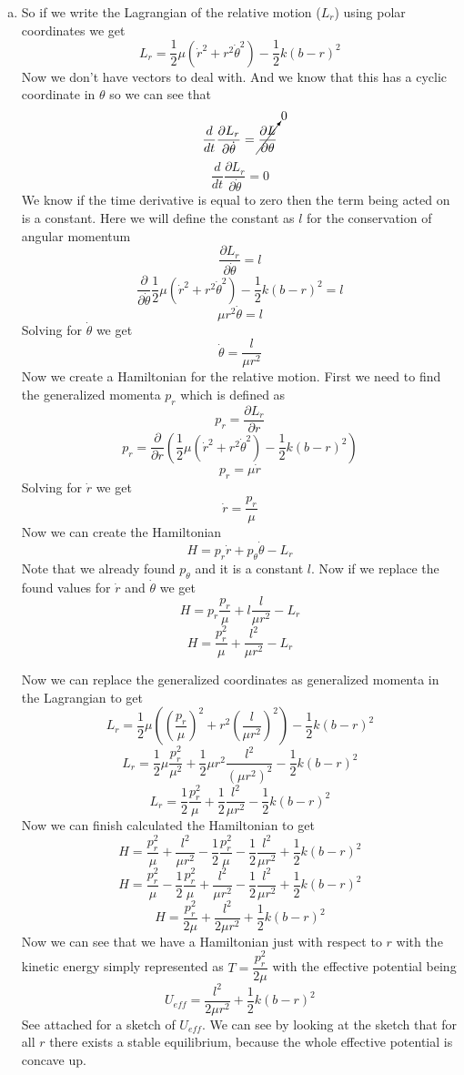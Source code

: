 \documentclass[11pt]{article}
\numberwithin{equation}{section}
\begin{document}
\begin{enumerate}[(a)]
\item
So if we write the Lagrangian of the relative motion ($L_r$) using polar coordinates we get
$$L_r = \frac{1}{2}\mu\left(\dot{r}^2 + r^2\dot{\theta}^2\right) - \frac{1}{2}k\left(b-r\right)^2$$
Now we don't have vectors to deal with. And we know that this has a cyclic coordinate in $\theta$ so we can see that
$$\frac{d}{dt}\frac{\partial L_r}{\partial \dot{\theta}} = \cancelto{0}{\frac{\partial L}{\partial {\theta}}}$$
$$\frac{d}{dt}\frac{\partial L_r}{\partial \dot{\theta}} = 0$$
We know if the time derivative is equal to zero then the term being acted on is a constant. Here we will define the constant as $l$ for the conservation of angular momentum 
$$\frac{\partial L_r}{\partial \dot{\theta}} = l$$
$$\frac{\partial}{\partial \dot{\theta}}\frac{1}{2}\mu\left(\dot{r}^2 + r^2\dot{\theta}^2\right) - \frac{1}{2}k\left(b-r\right)^2 = l$$
$$\mu r^2\dot{\theta} = l$$
Solving for $\dot{\theta}$ we get
$$\dot{\theta} = \frac{l}{\mu r^2}$$
Now we create a Hamiltonian for the relative motion. First we need to find the generalized momenta $p_r$ which is defined as
$$p_r = \frac{\partial L_r}{\partial r}$$
$$p_r = \frac{\partial}{\partial r}\left(\frac{1}{2}\mu\left(\dot{r}^2 + r^2\dot{\theta}^2\right) - \frac{1}{2}k\left(b-r\right)^2\right)$$
$$p_r = \mu \dot{r}$$
Solving for $\dot{r}$ we get
$$ \dot{r}= \frac{p_r}{\mu} $$
Now we can create the Hamiltonian
$$H =p_r\dot{r}+ p_{\theta} \dot{\theta} - L_r$$
Note that we already found $p_{\theta}$ and it is a constant $l$. Now if we replace the found values for $\dot{r}$ and $\dot{\theta}$ we get
$$H = p_r\frac{p_r}{\mu} + l\frac{l}{\mu r^2} - L_r$$
$$H = \frac{p_r^2}{\mu} + \frac{l^2}{\mu r^2} - L_r$$

Now we can replace the generalized coordinates as generalized momenta in the Lagrangian to get
$$L_r = \frac{1}{2}\mu\left(\left(\frac{p_r}{\mu}\right)^2 + r^2\left(\frac{l}{\mu r^2}\right)^2\right) - \frac{1}{2}k\left(b-r\right)^2$$
$$L_r = \frac{1}{2}\mu\frac{p_r^2}{\mu^2} + \frac{1}{2}\mu r^2\frac{l^2}{(\mu r^2)^2} - \frac{1}{2}k\left(b-r\right)^2$$
$$L_r = \frac{1}{2}\frac{p_r^2}{\mu} + \frac{1}{2} \frac{l^2}{\mu r^2} - \frac{1}{2}k\left(b-r\right)^2$$
Now we can finish calculated the Hamiltonian to get 
$$H = \frac{p_r^2}{\mu} + \frac{l^2}{\mu r^2} - \frac{1}{2}\frac{p_r^2}{\mu} - \frac{1}{2} \frac{l^2}{\mu r^2} + \frac{1}{2}k\left(b-r\right)^2$$
$$H = \frac{p_r^2}{\mu} - \frac{1}{2}\frac{p_r^2}{\mu}+ \frac{l^2}{\mu r^2}  - \frac{1}{2} \frac{l^2}{\mu r^2} + \frac{1}{2}k\left(b-r\right)^2$$
$$H = \frac{p_r^2}{2\mu}+ \frac{l^2}{2\mu r^2} + \frac{1}{2}k\left(b-r\right)^2$$
Now we can see that we have a Hamiltonian just with respect to $r$ with the kinetic energy simply represented as $T = \dfrac{p_r^2}{2\mu}$ with the effective potential being
$$U_{eff} = \frac{l^2}{2\mu r^2} + \frac{1}{2}k\left(b-r\right)^2$$
See attached for a sketch of $U_{eff}$. We can see by looking at the sketch that for all $r$ there exists a stable equilibrium, because the whole effective potential is concave up.
 
\end{enumerate}
\end{document}
